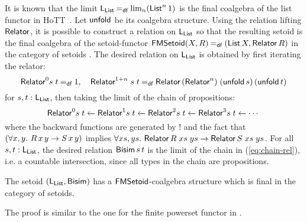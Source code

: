 \documentclass[runningheads]{llncs}
\begin{document}
It is known that the limit $\mathsf{L}_{\operatorname{\mathsf{List}}} \mathbin{=_\mathsf{df}} \lim_n (\operatorname{\mathsf{List}}^n 1)$ is the final coalgebra of the list functor in HoTT~\cite{Ahrens2015}. Let $\mathsf{unfold}$ be its coalgebra structure.  Using the relation lifting $\mathsf{Relator}$, it is possible to construct a relation on $\mathsf{L}_{\operatorname{\mathsf{List}}}$ so that the resulting setoid is the final coalgebra of the setoid-functor $\operatorname{\mathsf{FMSetoid}}(X,R) \mathbin{=_\mathsf{df}} (\operatorname{\mathsf{List}} X,\mathsf{Relator}\,R)$ in the category of setoids \cite{Barthe2003}. The desired relation on $\mathsf{L}_{\operatorname{\mathsf{List}}}$ is obtained by first iterating the relator:
\[
\mathsf{Relator}^0 s\;t \mathbin{=_\mathsf{df}} 1, \quad
\mathsf{Relator}^{1+n}\;s\;t \mathbin{=_\mathsf{df}} \mathsf{Relator}\,(\mathsf{Relator}^n)\;(\mathsf{unfold}\,s)\,(\mathsf{unfold}\,t)
\]
for $s,t : \mathsf{L}_{\operatorname{\mathsf{List}}}$, then taking the limit of the chain of propositions:
\begin{equation}\label{eq:chain-rel}
    \Relator^0 s\;t \xleftarrow{} {\Relator^1 s\;t}
      \xleftarrow{} {\Relator^2 s\;t}
      \xleftarrow{} {\Relator^3 s\;t}
      \xleftarrow{} %
      \cdots
\end{equation}
where the backward functions are generated by ! and the fact that $(\forall x,y\mathpunct{.}\, R \,x\,y \to S \,x\,y)$ implies $\forall xs,ys \mathpunct{.}\, \mathsf{Relator} \,R\;xs\;ys \to \mathsf{Relator} \,S\;xs\;ys$.
For all $s,t : \mathsf{L}_{\operatorname{\mathsf{List}}}$, the desired relation $\mathsf{Bisim}\,s\,t$ is the limit of the chain in (\ref{eq:chain-rel}), i.e. a countable intersection, since all types in the chain are propositions.
\begin{theorem}\label{thm:final-setoids}
The setoid $(\mathsf{L}_{\operatorname{\mathsf{List}}},\mathsf{Bisim})$ has a $\operatorname{\mathsf{FMSetoid}}$-coalgebra structure which is final in the category of setoids.
\end{theorem}
The proof is similar to the one for the finite powerset functor in \cite[{Theorem~1}]{Veltri2021}.
\end{document}

